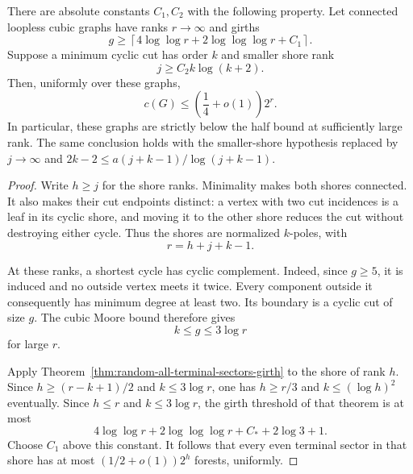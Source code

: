 \begin{corollary}
\label{cor:random-high-girth-large-shores}
There are absolute constants $C_1,C_2$ with the following property.
Let connected loopless cubic graphs have ranks $r\to\infty$ and girths
\[
 g\ge
 \left\lceil4\log\log r+2\log\log\log r+C_1\right\rceil.
\]
Suppose a minimum cyclic cut has order $k$ and smaller shore rank
\[
 j\ge C_2 k\log(k+2).
\]
Then, uniformly over these graphs,
\[
 c(G)\le\left(\frac14+o(1)\right)2^r.
\]
In particular, these graphs are strictly below the half bound at sufficiently large rank.
The same conclusion holds with the smaller-shore hypothesis replaced by
$j\to\infty$ and $2k-2\le a(j+k-1)/\log(j+k-1)$.
\end{corollary}

\begin{proof}
Write $h\ge j$ for the shore ranks.
Minimality makes both shores connected.
It also makes their cut endpoints distinct: a vertex with two cut incidences is a leaf in its cyclic shore, and moving it to the other shore reduces the cut without destroying either cycle.
Thus the shores are normalized $k$-poles, with
\[
 r=h+j+k-1.
\]

At these ranks, a shortest cycle has cyclic complement.
Indeed, since $g\ge5$, it is induced and no outside vertex meets it twice.
Every component outside it consequently has minimum degree at least two.
Its boundary is a cyclic cut of size $g$.
The cubic Moore bound therefore gives
\[
 k\le g\le3\log r
\]
for large $r$.

Apply Theorem~\ref{thm:random-all-terminal-sectors-girth} to the shore of rank $h$.
Since $h\ge(r-k+1)/2$ and $k\le3\log r$, one has $h\ge r/3$ and $k\le(\log h)^2$ eventually.
Since $h\le r$ and $k\le3\log r$, the girth threshold of that theorem is at most
\[
 4\log\log r+2\log\log\log r+C_*+2\log3+1.
\]
Choose $C_1$ above this constant.
It follows that every even terminal sector in that shore has at most
$(1/2+o(1))2^h$ forests, uniformly.


\end{proof}
